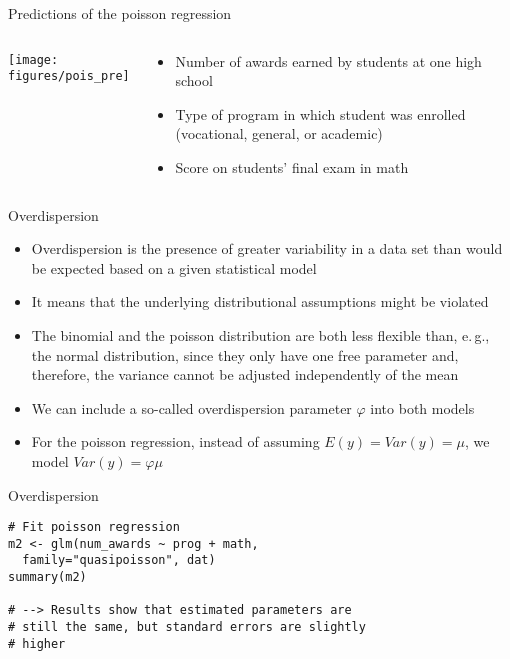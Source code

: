\documentclass{beamer}
\begin{document}
\begin{frame}{Predictions of the poisson regression}
\begin{columns}[c]
\begin{column}{6cm}
  \texttt{[image: figures/pois\_pre]}
\end{column}
\begin{column}{5cm}
  \begin{itemize}
    \item Number of awards earned by students at one high school
    \item Type of program in which student was enrolled (vocational,
    general, or academic)
    \item Score on students' final exam in math
  \end{itemize}
\end{column}
\end{columns}
\end{frame}

\begin{frame}{Overdispersion}
  \begin{itemize}
    \item Overdispersion is the presence of greater variability in a data
      set than would be expected based on a given statistical model
    \item It means that the underlying distributional assumptions might be
      violated
    \item The binomial and the poisson distribution are both less flexible
      than, e.\,g., the normal distribution, since they only have one free
      parameter and, therefore, the variance cannot be adjusted
      independently of the mean
    \item We can include a so-called overdispersion parameter $\varphi$
      into both models
    \item For the poisson regression, instead of assuming $E(y) = Var(y) =
      \mu$, we model $Var(y) = \varphi\mu$
  \end{itemize}
\end{frame}

{

\begin{frame}[fragile]{Overdispersion}
\begin{lstlisting}
# Fit poisson regression
m2 <- glm(num_awards ~ prog + math, 
  family="quasipoisson", dat)
summary(m2)

# --> Results show that estimated parameters are
# still the same, but standard errors are slightly
# higher
\end{lstlisting}
\end{frame}

}
\end{document}
